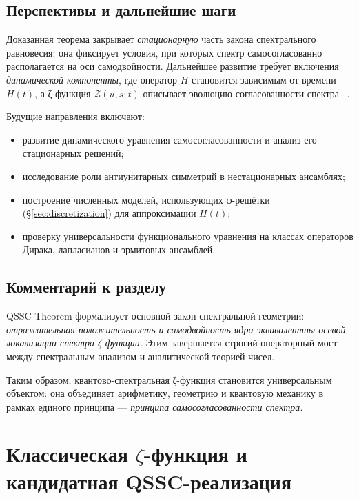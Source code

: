 \documentclass{article}
\numberwithin{equation}{section}
\theoremstyle{plain}
\theoremstyle{definition}
\theoremstyle{remark}
\begin{document}
\subsection{Перспективы и дальнейшие шаги}
\label{subsec:future}

Доказанная теорема закрывает \emph{стационарную} часть закона спектрального равновесия:
она фиксирует условия, при которых спектр самосогласованно располагается на оси самодвойности.
Дальнейшее развитие требует включения \emph{динамической компоненты},
где оператор $H$ становится зависимым от времени $H(t)$,
а ζ-функция $\mathcal Z(u,s;t)$ описывает эволюцию согласованности спектра ~\cite{Dyson1962}.

Будущие направления включают:
\begin{itemize}
  \item развитие динамического уравнения самосогласованности и анализ его стационарных решений;
  \item исследование роли антиунитарных симметрий в нестационарных ансамблях;
  \item построение численных моделей, использующих φ-решётки (§\ref{sec:discretization}) для аппроксимации $H(t)$;
  \item проверку универсальности функционального уравнения на классах операторов Дирака, лапласианов и эрмитовых ансамблей.
\end{itemize}

\subsection{Комментарий к разделу}
\label{subsec:summary12}

QSSC-Theorem формализует основной закон спектральной геометрии:
\emph{отражательная положительность и самодвойность ядра эквивалентны
осевой локализации спектра ζ-функции.}
Этим завершается строгий операторный мост между спектральным анализом и аналитической теорией чисел.

Таким образом, квантово-спектральная ζ-функция становится универсальным объектом:
она объединяет арифметику, геометрию и квантовую механику в рамках единого принципа —
\emph{принципа самосогласованности спектра.} ~\cite{Hilbert1901}

\clearpage

\appendix
\section{Классическая $\zeta$-функция и кандидатная QSSC-реализация}
\end{document}

